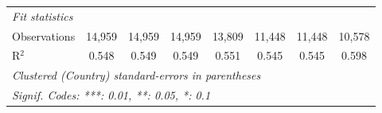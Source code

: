 \begin{tabular}{lccccccc}
   \midrule \emph{Fit statistics}\\
   Observations                                                   & 14,959         & 14,959        & 14,959        & 13,809        & 11,448         & 11,448         & 10,578\\  
   R$^2$                                                          & 0.548          & 0.549         & 0.549         & 0.551         & 0.545          & 0.545          & 0.598\\  
   \midrule
   \multicolumn{8}{l}{\emph{Clustered (Country) standard-errors in parentheses}}\\
   \multicolumn{8}{l}{\emph{Signif. Codes: ***: 0.01, **: 0.05, *: 0.1}}\\
\end{tabular}
\par\endgroup


